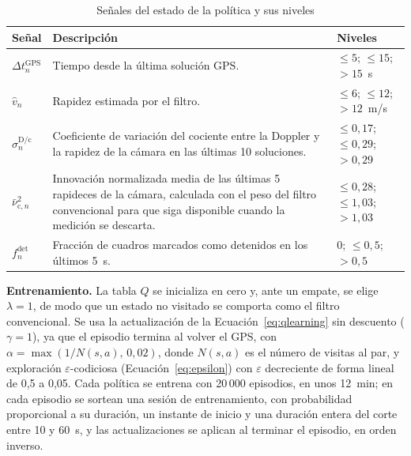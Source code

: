 \begin{table}[H]
\centering
\caption{Señales del estado de la política y sus niveles}
\label{tab:res-rl-estado}
\small
\begin{tabularx}{\textwidth}{@{}>{\raggedright\arraybackslash}p{1.6cm}>{\raggedright\arraybackslash}X>{\raggedright\arraybackslash}p{4.3cm}@{}}
\toprule
\textbf{Señal} & \textbf{Descripción} & \textbf{Niveles} \\
\midrule
$\Delta t^{\mathrm{GPS}}_n$ & Tiempo desde la última solución GPS. & $\le 5$; $\le 15$; $> 15$~s \\
$\hat{v}_n$ & Rapidez estimada por el filtro. & $\le 6$; $\le 12$; $> 12$~m/s \\
$\sigma^{\mathrm{D/c}}_n$ & Coeficiente de variación del cociente entre la Doppler y la rapidez de la cámara en las últimas 10 soluciones. & $\le 0{,}17$; $\le 0{,}29$; $> 0{,}29$ \\
$\bar{\nu}^{2}_{\mathrm{c},n}$ & Innovación normalizada media de las últimas 5 rapideces de la cámara, calculada con el peso del filtro convencional para que siga disponible cuando la medición se descarta. & $\le 0{,}28$; $\le 1{,}03$; $> 1{,}03$ \\
$f^{\mathrm{det}}_n$ & Fracción de cuadros marcados como detenidos en los últimos 5~s. & $0$; $\le 0{,}5$; $> 0{,}5$ \\
\bottomrule
\end{tabularx}
\end{table}

\textbf{Entrenamiento.}
La tabla $Q$ se inicializa en cero y, ante un empate, se elige $\lambda = 1$, de modo que un estado no visitado se comporta como el filtro convencional.
Se usa la actualización de la Ecuación~\eqref{eq:qlearning} sin descuento ($\gamma = 1$), ya que el episodio termina al volver el GPS, con $\alpha = \max\!\left(1/N(s,a),\, 0{,}02\right)$, donde $N(s,a)$ es el número de visitas al par, y exploración $\varepsilon$-codiciosa (Ecuación~\eqref{eq:epsilon}) con $\varepsilon$ decreciente de forma lineal de 0,5 a 0,05.
Cada política se entrena con 20\,000 episodios, en unos 12~min; en cada episodio se sortean una sesión de entrenamiento, con probabilidad proporcional a su duración, un instante de inicio y una duración entera del corte entre 10 y 60~s, y las actualizaciones se aplican al terminar el episodio, en orden inverso.

